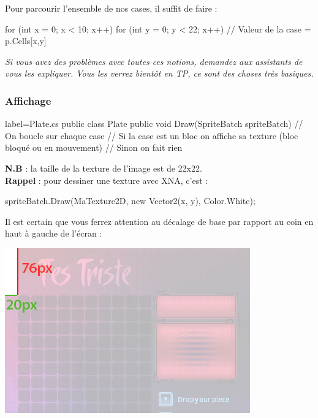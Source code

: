 \documentclass[a4paper]{article}
\begin{document}
\vspace{0.2cm}

Pour parcourir l'ensemble de nos cases, il suffit de faire : \\

\begin{csharpcode}
for (int x = 0; x < 10; x++)
{
    for (int y = 0; y < 22; x++)
    {
        // Valeur de la case =  p.Cells[x,y]
    }
}
\end{csharpcode}

\vspace{0.2cm}

\noindent\emph{\color{toogyblue} Si vous avez des problèmes avec toutes ces notions,
demandez aux assistants de vous les expliquer. Vous les verrez bientôt en TP,
ce sont des choses très basiques.} \\

\subsubsection{Affichage}

\begin{csharpcode*}{label=Plate.cs}
public class Plate
{
    public void Draw(SpriteBatch spriteBatch)
    {
        // On boucle sur chaque case
        // Si la case est un bloc on affiche sa texture (bloc bloqué ou en mouvement)
        // Sinon on fait rien
    }
}
\end{csharpcode*}

\vspace{0.2cm}

\noindent\textbf{N.B} : la taille de la texture de l'image est de 22x22. \\

\textbf{Rappel} : pour dessiner une texture avec XNA, c'est : \\

\begin{csharpcode}
spriteBatch.Draw(MaTexture2D, new Vector2(x, y), Color.White);
\end{csharpcode}

\vspace{0.2cm}

Il est certain que vous ferrez attention au décalage de base par rapport au
coin en haut à gauche de l'écran : \\

\begin{center}
    \includegraphics[scale=0.5]{img/decalage.png}
\end{center}
\end{document}
